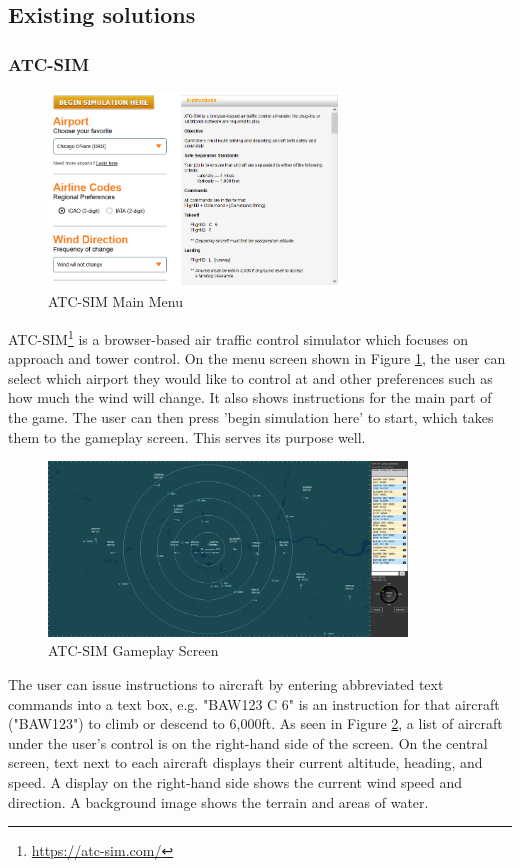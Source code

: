 \documentclass{article}
\begin{document}
\subsection{Existing solutions} \label{existingsolutions}
\subsubsection{ATC-SIM}
\begin{figure}[H]
\centering
\includegraphics[width=0.7\textwidth]{existing_solutions/atcsimmenu.png}
\caption{\label{fig:atcsimmenu}ATC-SIM Main Menu}
\end{figure}
ATC-SIM\footnote{\url{https://atc-sim.com/}} is a browser-based air traffic control simulator which focuses on approach and tower control.
On the menu screen shown in Figure \ref{fig:atcsimmenu}, the user can select which airport they would like to control at and other preferences such as how much the wind will change.
It also shows instructions for the main part of the game.
The user can then press 'begin simulation here' to start, which takes them to the gameplay screen.
This serves its purpose well.
\begin{figure}[H]
\centering
\includegraphics[width=0.85\textwidth]{existing_solutions/atcsim1.png}
\caption{\label{fig:atcsim1}ATC-SIM Gameplay Screen}
\end{figure}
The user can issue instructions to aircraft by entering abbreviated text commands into a text box, e.g. "BAW123 C 6" is an instruction for that aircraft ("BAW123") to climb or descend to 6,000ft.
As seen in Figure \ref{fig:atcsim1}, a list of aircraft under the user's control is on the right-hand side of the screen.
On the central screen, text next to each aircraft displays their current altitude, heading, and speed.
A display on the right-hand side shows the current wind speed and direction.
A background image shows the terrain and areas of water.
\end{document}
